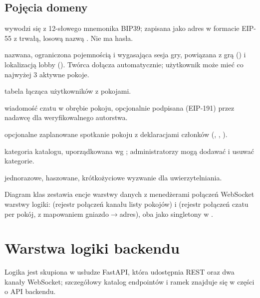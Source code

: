 \subsection{Pojęcia domeny}
\label{sec:arch-pojecia}

\begin{description}[style=nextline,leftmargin=1.2em]
  \item[Tożsamość / User] wywodzi się z 12-słowego mnemonika BIP39; zapisana jako adres
         w formacie EIP-55 z trwałą, losową nazwą .
        Nie ma hasła.
  \item[Room (pokój)] nazwana, ograniczona pojemnością i wygasająca sesja gry,
        powiązana z grą () i lokalizacją lobby (). Twórca
        dołącza automatycznie; użytkownik może mieć co najwyżej 3 aktywne pokoje.
  \item[RoomMember] tabela łącząca użytkowników z pokojami.
  \item[Message] wiadomość czatu w obrębie pokoju, opcjonalnie podpisana (EIP-191) przez
        nadawcę dla weryfikowalnego autorstwa.
  \item[RoomEvent / RoomEventRsvp] opcjonalne zaplanowane spotkanie pokoju z
        deklaracjami członków (, , ).
  \item[Game] kategoria katalogu, uporządkowana wg ; administratorzy
        mogą dodawać i usuwać kategorie.
  \item[Nonce] jednorazowe, haszowane, krótkożyciowe wyzwanie dla uwierzytelniania.
\end{description}

Diagram klas zestawia encje warstwy danych z menedżerami połączeń WebSocket warstwy
logiki:  (rejestr połączeń kanału listy pokojów) i
 (rejestr połączeń czatu per pokój, z mapowaniem gniazdo$\rightarrow$adres),
oba jako singletony w .


\section{Warstwa logiki backendu}
\label{sec:arch-logika}

Logika jest skupiona w usłudze FastAPI, która udostępnia REST oraz dwa kanały WebSocket;
szczegółowy katalog endpointów i ramek znajduje się w części o API backendu.

